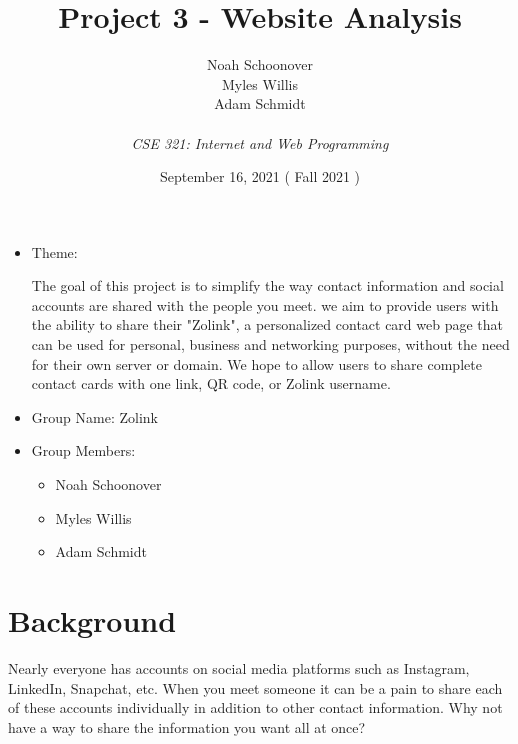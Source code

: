\documentclass[12pt]{article}%
\def\assignmentName { Project 3 - Website Analysis                      }
\def\className      { CSE 321: Internet and Web Programming             }
\def\studentName    { Noah Schoonover \\ Myles Willis \\ Adam Schmidt   }
\def\studentEmail   {  }
\def\dueDate        { September 16, 2021                                }
\def\semesterDate   { Fall 2021                                         }
\begin{document}


\begin{singlespace}
\title{ \assignmentName }
\author{ \studentName \\ {\small \studentEmail} \\ {\it \className}}
\date{\dueDate (\semesterDate)}
\maketitle
\end{singlespace}



\begin{itemize}
    \item Theme:

    The goal of this project is to simplify the way contact information and social accounts are shared with the people you meet.
    we aim to provide users with the ability to share their "Zolink", a personalized contact card web page that can be used for personal,
    business and networking purposes, without the need for their own server or domain. We hope to allow users to share complete
    contact cards with one link, QR code, or Zolink username.

    \item Group Name: Zolink
    \item Group Members:
    \begin{itemize}
    	\item Noah Schoonover
    	\item Myles Willis
    	\item Adam Schmidt
    \end{itemize}
\end{itemize}


\section{Background}

Nearly everyone has accounts on social media platforms such as Instagram, LinkedIn, Snapchat, etc. When you meet someone it can
be a pain to share each of these accounts individually in addition to other contact information. Why not have a way to share the
information you want all at once?
\end{document}
